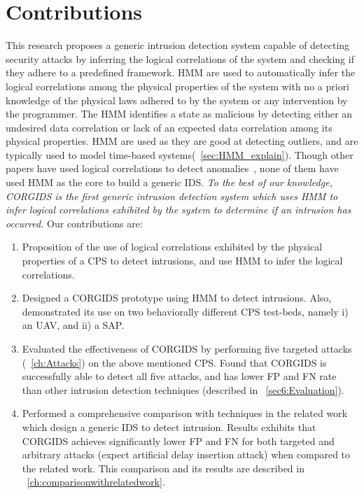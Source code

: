 \section{Contributions}
\label{sec:Contributions}

This research proposes a generic intrusion detection system capable of detecting security attacks by inferring the logical correlations of the system and checking if they adhere to a predefined framework. \ac{HMM}  are used to automatically infer the logical correlations among the physical properties of the system with no a priori knowledge of the physical laws adhered to by the system or any intervention by the programmer. The \ac{HMM} identifies a state as malicious by detecting either an undesired data correlation or lack of an expected data correlation among its physical properties. \ac{HMM} are used as they are good at detecting outliers, and are typically used to model time-based systems(~\autoref{sec:HMM_explain}).  
Though other papers have used logical correlations to detect anomalies~\cite{iturbe2017feasibility,krotofil2015process,chen2018learning,zohrevand2016hidden}, none of them have used \ac{HMM} as the core to build a generic \ac{IDS}. \textit{To the best of our knowledge, \ac{CORGIDS} is the first generic intrusion detection system which uses \ac{HMM} to infer logical correlations exhibited by the system to determine if an intrusion has occurred.} Our contributions are:

\begin{enumerate}

\item Proposition of the use of logical correlations exhibited by the physical properties of a \ac{CPS} to detect intrusions, and use \acf{HMM} to infer the logical correlations.

\item Designed a \acf{CORGIDS} prototype using \acf{HMM} to detect intrusions. Also, demonstrated its use on two behaviorally different \ac{CPS} test-beds, namely i) an \ac{UAV}, and ii) a \acf{SAP}.

\item Evaluated the effectiveness of \ac{CORGIDS} by performing five targeted attacks (~\autoref{ch:Attacks}) on the above mentioned \ac{CPS}. Found that \ac{CORGIDS} is successfully able to detect all five attacks, and has lower \acf{FP} and \acf{FN} rate than other intrusion detection techniques (described in ~\autoref{sec6:Evaluation}).

\item Performed a comprehensive comparison with techniques in the related work which design a generic IDS to detect intrusion. Results exhibits that \ac{CORGIDS} achieves significantly lower \ac{FP} and \ac{FN} for both targeted and arbitrary attacks (expect artificial delay insertion attack) when compared to the related work. This comparison and its results are described in ~\autoref{ch:comparisonwithrelatedwork}.

\end{enumerate}

\endinput
